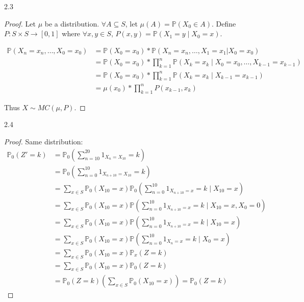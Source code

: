 \documentclass{article}
\newcommand{\PR}{\mathbb{P}}
\begin{document}
\begin{PROB}{2.3}\label{Problem 2.3.}
\end{PROB}
\begin{proof}
    Let $\mu$ be a distribution. $\forall A \subseteq S$, let $\mu(A) = \PR(X_0 \in A)$. Define $P: S \times S \to [0, 1]$ where $\forall x, y \in S$, $P(x, y) = \PR(X_1 = y \mid X_0 = x)$.
    
    \begin{align*}
        \PR(X_n = x_n, \dots, X_0 = x_0) &= \PR(X_0 = x_0) * \PR(X_n = x_n, \dots, X_1 = x_1 | X_0 = x_0) \\
        &= \PR(X_0 = x_0) * \prod_{k = 1}^{n} \PR(X_k = x_k \mid X_0 = x_0, \dots, X_{k - 1} = x_{k - 1}) \\ 
        &= \PR(X_0 = x_0) * \prod_{k = 1}^{n} \PR(X_k = x_k \mid X_{k - 1} = x_{k - 1}) \\
        &= \mu(x_0) * \prod_{k = 1}^{n} P(x_{k-1}, x_{k})
    \end{align*}

    Thus $X \sim MC(\mu, P)$.  
\end{proof}

\bigskip

\begin{PROB}{2.4}\label{Problem 2.4.}
    
\end{PROB}
\begin{proof}
    Same distribution:
    \begin{align*}
        \PR_0(Z' = k) &= \PR_0\left(\sum_{n = 10}^{20}1_{X_n = X_{10}} = k\right) \\
        &= \PR_0\left(\sum_{n = 0}^{10}1_{X_{n + 10} = X_{10}} = k\right) \\
        &= \sum_{x \in S}\PR_{0}(X_{10} = x) \PR_{0}\left(\sum_{n = 0}^{10} 1_{X_{n + 10} = x} = k \mid X_{10} = x\right) \\
        &= \sum_{x \in S}\PR_{0}(X_{10} = x) \PR\left(\sum_{n = 0}^{10} 1_{X_{n + 10} = x} = k \mid X_{10} = x, X_0 = 0\right) \\
        &= \sum_{x \in S}\PR_{0}(X_{10} = x) \PR\left(\sum_{n = 0}^{10} 1_{X_{n + 10} = x} = k \mid X_{10} = x\right) \\
        &= \sum_{x \in S}\PR_{0}(X_{10} = x) \PR\left(\sum_{n = 0}^{10} 1_{X_{n} = x} = k \mid X_{0} = x\right) \\
        &= \sum_{x \in S}\PR_{0}(X_{10} = x) \PR_x\left(Z = k\right) \\
        &= \sum_{x \in S}\PR_{0}(X_{10} = x) \PR_0\left(Z = k\right) \\
        &= \PR_0(Z = k) \left(\sum_{x \in S}\PR_{0}(X_{10} = x)\right) = \PR_0(Z = k)
    \end{align*}

    
\end{proof}
\end{document}
